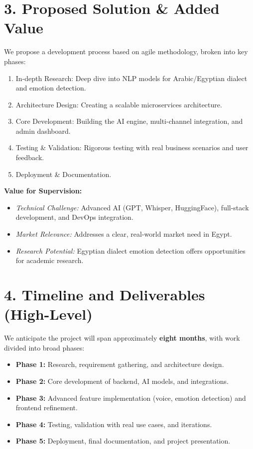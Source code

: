 \documentclass[12pt,a4paper]{article}
\begin{document}
\section*{3. Proposed Solution \& Added Value}

We propose a development process based on agile methodology, broken into key phases:
\begin{enumerate}[leftmargin=*]
    \item In-depth Research: Deep dive into NLP models for Arabic/Egyptian dialect and emotion detection.
    \item Architecture Design: Creating a scalable microservices architecture.
    \item Core Development: Building the AI engine, multi-channel integration, and admin dashboard.
    \item Testing \& Validation: Rigorous testing with real business scenarios and user feedback.
    \item Deployment \& Documentation.
\end{enumerate}

\textbf{Value for Supervision:}
\begin{itemize}[leftmargin=*]
    \item \textit{Technical Challenge:} Advanced AI (GPT, Whisper, HuggingFace), full-stack development, and DevOps integration.
    \item \textit{Market Relevance:} Addresses a clear, real-world market need in Egypt.
    \item \textit{Research Potential:} Egyptian dialect emotion detection offers opportunities for academic research.
\end{itemize}

\section*{4. Timeline and Deliverables (High-Level)}
We anticipate the project will span approximately \textbf{eight months}, with work divided into broad phases: 
\begin{itemize}[leftmargin=*]
    \item \textbf{Phase 1:} Research, requirement gathering, and architecture design.  
    \item \textbf{Phase 2:} Core development of backend, AI models, and integrations.  
    \item \textbf{Phase 3:} Advanced feature implementation (voice, emotion detection) and frontend refinement.  
    \item \textbf{Phase 4:} Testing, validation with real use cases, and iterations.  
    \item \textbf{Phase 5:} Deployment, final documentation, and project presentation.  
\end{itemize}
\end{document}
